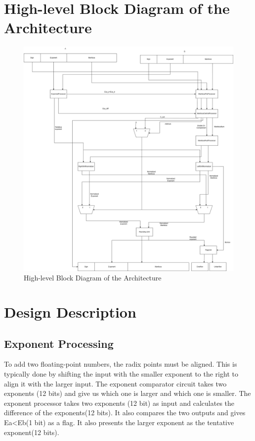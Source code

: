 \documentclass[18pt]{article}
\begin{document}
\section{High-level Block Diagram of the Architecture}
\begin{figure}[!h]
    \centering
    \captionsetup{font=Large}
    \includegraphics[width=\textwidth]{Util/block.png}
    \caption{High-level Block Diagram of the Architecture}
\end{figure}

\clearpage

\section{Design Description}
\subsection{Exponent Processing}
\Large
To add two floating-point numbers, the radix points must be aligned. This is typically done by shifting the input with the smaller exponent to the right to align it with the larger input. The exponent comparator circuit takes two exponents (12 bits) and give us which one is larger and which one is smaller.
 The exponent processor takes two exponents (12 bit) as input and calculates the difference of the exponents(12 bits). It also compares the two outputs and gives Ea<Eb(1 bit) as a flag. It also presents the larger exponent as the tentative exponent(12 bits).
\end{document}
